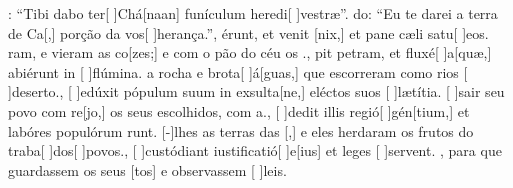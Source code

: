 {  %
  {: ``Tibi dabo ter[ ]{Chá}[naan] funículum heredi[ ]{ve}stræ''.}%
    {do: ``Eu te darei a terra de Ca[,] porção da vos[ ]{he}{ran}ça.''},
  {érunt, et venit [nix,] et pane cæli satu[ ]{e}os.}%
    {ram, e vieram as co[zes;] e com o pão do céu os .},
  {pit petram, et fluxé[ ]{a}[quæ,] abiérunt in [ ]{flú}mina.}%
    { a rocha e brota[ ]{á}[guas,] que escorreram como rios [ ]{de}{ser}to.},
  {[ ]{e}dúxit pópulum suum in exsulta[ne,] eléctos suos [ ]{læ}{tí}tia.}%
    {[ ]{sa}ir seu povo com re[jo,] os seus escolhidos, com a.},
  {[ ]{de}dit illis regió[ ]{gén}[tium,] et labóres populórum runt.}%
    {[-]{lhes} as terras das [,] e eles herdaram os frutos do traba[ ]{dos}[ ]{po}vos.},
  {[ ]{cu}stódiant iustificatió[ ]{e}[ius] et leges [ ]{ser}\-vent.}%
    {, para que guardassem os seus [tos] e observassem [ ]{leis}.}
}